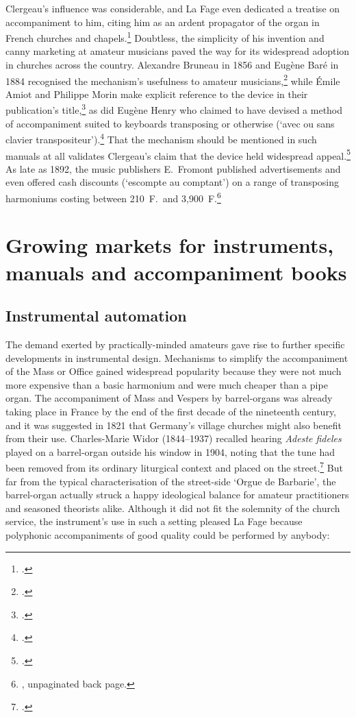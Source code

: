 Clergeau's influence was considerable, and La Fage even dedicated a treatise on accompaniment to him, citing him as an ardent propagator of the organ in French churches and chapels.\footcite[3]{LaFageRoutinepouraccompagner1860}
Doubtless, the simplicity of his invention and canny marketing at amateur musicians paved the way for its widespread adoption in churches across the country.
%
Alexandre Bruneau in 1856 and Eugène Baré in 1884 recognised the mechanism's usefulness to amateur musicians,\footcites[5]{BruneauMethodesimplefacile1856}[20]{BareNouvellemethodesimple1884} while Émile Amiot and Philippe Morin make explicit reference to the device in their publication's title,\footnote{\covid{}\cite{AmiotMethodeelementaireaccompagnement1862}.} as did Eugène Henry who claimed to have devised a method of accompaniment suited to keyboards transposing or otherwise (`avec ou sans clavier transpositeur').\footcite[29--31]{HenryMethodepouraccompagner1869}
That the mechanism should be mentioned in such manuals at all validates Clergeau's claim that the device held widespread appeal.\footcite[3]{ClergeauMecanismemusicaltranspositeur1845}
As late as 1892, the music publishers E.\ Fromont published advertisements and even offered cash discounts (`escompte au comptant') on a range of transposing harmoniums costing between 210~F.\ and 3,900~F.\footnote{\cite{Calonneharmonieappliqueeau1892}, unpaginated back page.}

\section{Growing markets for instruments, manuals and accompaniment books}
\subsection{Instrumental automation}
The demand exerted by practically-minded amateurs gave rise to further specific developments in instrumental design.
Mechanisms to simplify the accompaniment of the Mass or Office gained widespread popularity because they were not much more expensive than a basic harmonium and were much cheaper than a pipe organ.
The accompaniment of Mass and Vespers by barrel-organs was already taking place in France by the end of the first decade of the nineteenth century, and it was suggested in 1821 that Germany's village churches might also benefit from their use.
Charles-Marie Widor (1844--1937) recalled hearing \emph{Adeste fideles} played on a barrel-organ outside his window in 1904, noting that the tune had been removed from its ordinary liturgical context and placed on the street.\footcite[59]{Widorrevisionplainchant1904}
But far from the typical characterisation of the street-side `Orgue de Barbarie', the barrel-organ actually struck a happy ideological balance for amateur practitioners and seasoned theorists alike.
Although it did not fit the solemnity of the church service, the instrument's use in such a setting pleased La Fage because polyphonic accompaniments of good quality could be performed by anybody:

